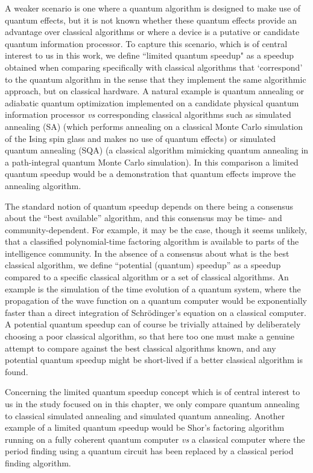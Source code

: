  A weaker scenario is one where a quantum algorithm is designed to make use of quantum effects, but it is not known whether these quantum effects provide an advantage over classical algorithms or where a device is a putative or candidate quantum information processor. To capture this scenario, which is of central interest to us in this work, we define ``limited quantum speedup" as a speedup obtained when comparing specifically with classical algorithms that `correspond' to the quantum algorithm in the sense that they implement the same algorithmic approach, but on classical hardware. A natural example is quantum annealing \cite{kadowaki_quantum_1998,Brooke1999} or adiabatic quantum optimization \cite{farhi} implemented on a candidate physical quantum information processor \textit{vs} corresponding classical algorithms such as simulated annealing (SA) \cite{Kirkpatrick1983} (which performs annealing on a classical Monte Carlo simulation of the Ising spin glass and makes no use of quantum effects) or simulated quantum annealing (SQA) \cite{PhysRevB.66.094203,Santoro} (a classical algorithm mimicking quantum annealing in a path-integral quantum Monte Carlo simulation). In this comparison a limited quantum speedup would be a demonstration that quantum effects improve the annealing algorithm.

The standard notion of quantum speedup depends on there being a consensus about the ``best available'' algorithm, and this consensus may be time- and community-dependent. For example, it may be the case, though it seems unlikely, that a classified polynomial-time factoring algorithm is available to parts of the intelligence community. In the absence of a consensus about what is the best classical algorithm, we define ``potential (quantum) speedup'' as a speedup compared to a specific classical algorithm or a set of classical algorithms. An example is the simulation of the time evolution of a quantum system, where the propagation of the wave function on a quantum computer would be exponentially faster than a direct integration of  Schr\"odinger's equation on a classical computer. A potential quantum speedup can of course be trivially attained by deliberately choosing a poor classical algorithm, so that here too one must make a genuine attempt to compare against the best classical algorithms known, and any potential quantum speedup might be short-lived if a better classical algorithm is found.

 Concerning the limited quantum speedup concept which is of central interest to us in the study focused on in this chapter, we only compare quantum annealing  to classical simulated annealing and simulated quantum annealing. Another example of a limited quantum speedup would be Shor's factoring algorithm running on a fully coherent quantum computer \textit{vs} a classical computer where the period finding using a quantum circuit has been replaced by a classical period finding algorithm.



